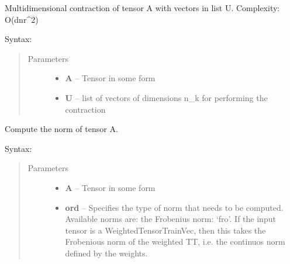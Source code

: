\documentclass[a4paper,10pt,english]{sphinxmanual}
\begin{document}
\begin{fulllineitems}
\label{api-multilinalg:TensorToolbox.multilinalg.contraction}
Multidimensional contraction of tensor A with vectors in list U.
Complexity: O(dnr\textasciicircum{}2)
\begin{description}
\item[{Syntax:}] \leavevmode
{}

\end{description}
\begin{quote}\begin{description}
\item[{Parameters}] \leavevmode\begin{itemize}
\item {} 
\textbf{A} -- Tensor in some form

\item {} 
\textbf{U} -- list of vectors of dimensions n\_k for performing the contraction

\end{itemize}

\end{description}\end{quote}

\end{fulllineitems}


\begin{fulllineitems}
\label{api-multilinalg:TensorToolbox.multilinalg.norm}
Compute the norm of tensor A.
\begin{description}
\item[{Syntax:}] \leavevmode
{}

\end{description}
\begin{quote}\begin{description}
\item[{Parameters}] \leavevmode\begin{itemize}
\item {} 
\textbf{A} -- Tensor in some form

\item {} 
\textbf{ord} -- Specifies the type of norm that needs to be computed. Available norms are: the Frobenius norm: `fro'. If the input tensor is a WeightedTensorTrainVec, then this takes the Frobenious norm of the weighted TT, i.e. the continuos norm defined by the weights.

\end{itemize}

\end{description}\end{quote}

\end{fulllineitems}
\end{document}
